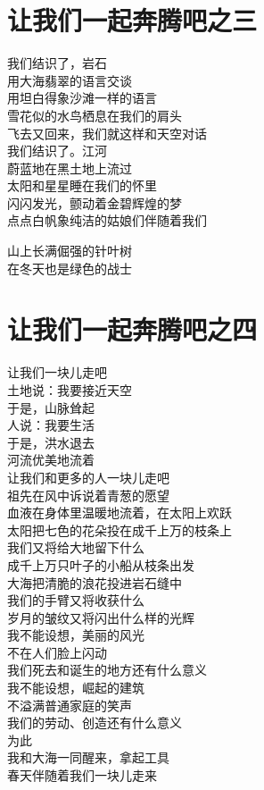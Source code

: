 \documentclass[]{book}
\renewenvironment{quote}{\begin{VF}}{\end{VF}}
\begin{document}
\section{让我们一起奔腾吧之三}

\begin{quote}
我们结识了，岩石\\
用大海翡翠的语言交谈\\
用坦白得象沙滩一样的语言\\
雪花似的水鸟栖息在我们的肩头\\
飞去又回来，我们就这样和天空对话\\
我们结识了。江河\\
蔚蓝地在黑土地上流过\\
太阳和星星睡在我们的怀里\\
闪闪发光，颤动着金碧辉煌的梦\\
点点白帆象纯洁的姑娘们伴随着我们

山上长满倔强的针叶树\\
在冬天也是绿色的战士
\end{quote}

\section{让我们一起奔腾吧之四}

\begin{quote}
让我们一块儿走吧\\
土地说：我要接近天空\\
于是，山脉耸起\\
人说：我要生活\\
于是，洪水退去\\
河流优美地流着\\
让我们和更多的人一块儿走吧\\
祖先在风中诉说着青葱的愿望\\
血液在身体里温暖地流着，在太阳上欢跃\\
太阳把七色的花朵投在成千上万的枝条上\\
我们又将给大地留下什么\\
成千上万只叶子的小船从枝条出发\\
大海把清脆的浪花投进岩石缝中\\
我们的手臂又将收获什么\\
岁月的皱纹又将闪出什么样的光辉\\
我不能设想，美丽的风光\\
不在人们脸上闪动\\
我们死去和诞生的地方还有什么意义\\
我不能设想，崛起的建筑\\
不溢满普通家庭的笑声\\
我们的劳动、创造还有什么意义\\
为此\\
我和大海一同醒来，拿起工具\\
春天伴随着我们一块儿走来
\end{quote}
\end{document}

